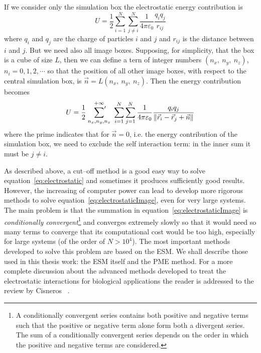 If we consider only the simulation box the electrostatic energy contribution is
\begin{equation}
	U = \frac{1}{2}\sum_{i=1}^N\sum_{j\ne i}^N\frac{1}{4\pi\varepsilon_0}\frac{q_iq_j}{r_{ij}}
	\label{eq:electrostatic}
\end{equation}
where $q_i$ and $q_j$ are the charge of particles $i$ and $j$ and $r_{ij}$ is the distance between $i$ and $j$. 
But we need also all image boxes. Supposing, for simplicity, that the box is a cube of size $L$, then we can 
define a tern of integer numbers $(n_x,\ n_y,\ n_z)$, $n_i=0,1,2,\cdots$ so that the position of all other image 
boxes, with respect to the central simulation box, is $\vec n = L (n_x,\ n_y,\ n_z)$. Then the energy 
contribution becomes
\begin{equation}
	U = \frac{1}{2}\ \sideset{}{'}\sum_{n_x,n_y,n_z}^{+\infty}\ \sum_{i=1}^N\sum_{j=1}^N\frac{1}{4\pi\varepsilon_0}\frac{q_iq_j}{\|\vec r_i - \vec r_j + \vec n \|}
	\label{eq:electrostaticImage}
\end{equation}
where the prime indicates that for $\vec n = 0$, i.e. the energy contribution of the simulation box, we need to 
exclude the self interaction term: in the inner sum it must be $j \ne i$.

As described above, a cut--off method is a good easy way to solve equation~\eqref{eq:electrostatic} and sometimes 
it produces sufficiently good results. However, the increasing of computer power can lead to develop more 
rigorous methods to solve equation~\eqref{eq:electrostaticImage}, even for very large systems. The main problem 
is that the summation in equation~\eqref{eq:electrostaticImage} is \textit{conditionally convergent}\footnote{A 
conditionally convergent series contains both positive and negative terms such that the positive or negative term 
alone form both a divergent series. The sum of a conditionally convergent series depends on the order in which 
the positive and negative terms are considered.} and converges extremely slowly so that it would need so many 
terms to converge that its computational cost would be too high, especially for large systems (of the order of 
$N > 10^4$). The most important methods developed to solve this problem are based on the \ac{ESM}. We shall 
describe those used in this thesis work: the \ac{ESM} itself and the \ac{PME} method. For a more complete 
discussion about the advanced methods developed to treat the electrostatic interactions for biological 
applications the reader is addressed to the review by Cisneros \etal\, \cite{Cisneros}.

